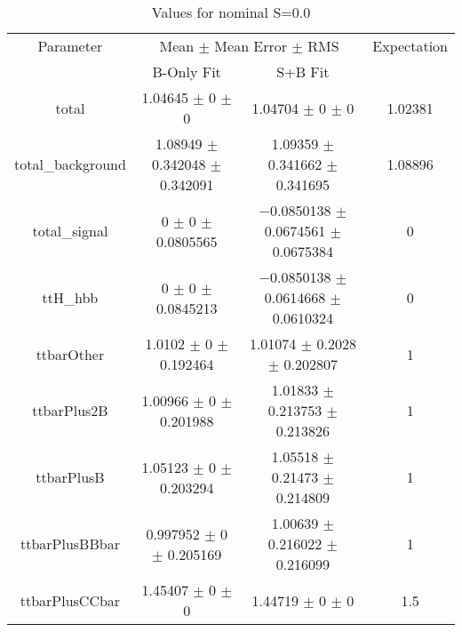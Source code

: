 \begin{table}
\centering
\caption{Values for nominal S=0.0}
\begin{tabular}{cccc}
\toprule
Parameter & \multicolumn{2}{c}{Mean $\pm$ Mean Error $\pm$ RMS} & Expectation\\
 & B-Only Fit & S+B Fit & \\
\midrule
total & \num{1.04645} $\pm$ \num{0} $\pm$ \num{0} & \num{1.04704} $\pm$ \num{0} $\pm$ \num{0} & \num{1.02381}\\
total\_background & \num{1.08949} $\pm$ \num{0.342048} $\pm$ \num{0.342091} & \num{1.09359} $\pm$ \num{0.341662} $\pm$ \num{0.341695} & \num{1.08896}\\
total\_signal & \num{0} $\pm$ \num{0} $\pm$ \num{0.0805565} & \num{-0.0850138} $\pm$ \num{0.0674561} $\pm$ \num{0.0675384} & \num{0}\\
ttH\_hbb & \num{0} $\pm$ \num{0} $\pm$ \num{0.0845213} & \num{-0.0850138} $\pm$ \num{0.0614668} $\pm$ \num{0.0610324} & \num{0}\\
ttbarOther & \num{1.0102} $\pm$ \num{0} $\pm$ \num{0.192464} & \num{1.01074} $\pm$ \num{0.2028} $\pm$ \num{0.202807} & \num{1}\\
ttbarPlus2B & \num{1.00966} $\pm$ \num{0} $\pm$ \num{0.201988} & \num{1.01833} $\pm$ \num{0.213753} $\pm$ \num{0.213826} & \num{1}\\
ttbarPlusB & \num{1.05123} $\pm$ \num{0} $\pm$ \num{0.203294} & \num{1.05518} $\pm$ \num{0.21473} $\pm$ \num{0.214809} & \num{1}\\
ttbarPlusBBbar & \num{0.997952} $\pm$ \num{0} $\pm$ \num{0.205169} & \num{1.00639} $\pm$ \num{0.216022} $\pm$ \num{0.216099} & \num{1}\\
ttbarPlusCCbar & \num{1.45407} $\pm$ \num{0} $\pm$ \num{0} & \num{1.44719} $\pm$ \num{0} $\pm$ \num{0} & \num{1.5}\\
\bottomrule
\end{tabular}
\end{table}